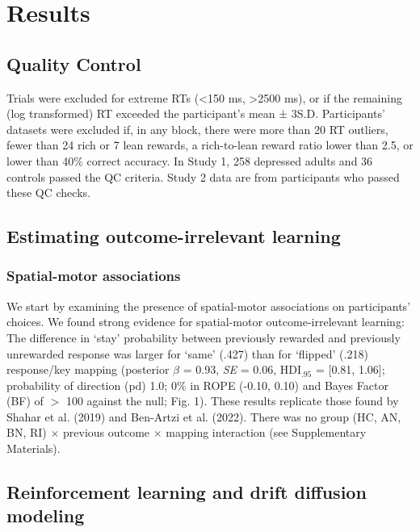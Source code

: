 \documentclass[
  man,floatsintext]{apa6}
\begin{document}
\hypertarget{results}{%
\section{Results}\label{results}}

\hypertarget{quality-control}{%
\subsection{Quality Control}\label{quality-control}}

Trials were excluded for extreme RTs (\textless150 ms, \textgreater2500 ms), or if
the remaining (log transformed) RT exceeded the participant's
mean ± 3S.D. Participants' datasets were excluded if, in any
block, there were more than 20 RT outliers, fewer than 24 rich
or 7 lean rewards, a rich-to-lean reward ratio lower than 2.5, or
lower than 40\% correct accuracy. In Study 1, 258 depressed adults
and 36 controls passed the QC criteria. Study 2 data are from participants who passed these QC checks.

\hypertarget{estimating-outcome-irrelevant-learning}{%
\subsection{Estimating outcome-irrelevant learning}\label{estimating-outcome-irrelevant-learning}}

\hypertarget{spatial-motor-associations}{%
\subsubsection{Spatial-motor associations}\label{spatial-motor-associations}}

We start by examining the presence of spatial-motor associations on participants' choices. We found strong evidence for spatial-motor outcome-irrelevant learning: The difference in `stay' probability between previously rewarded and previously unrewarded response was larger for `same' (.427) than for `flipped' (.218) response/key mapping (posterior \(\beta\) = 0.93, \emph{SE} = 0.06, \(\text{HDI}_{.95}\) = {[}0.81, 1.06{]}; probability of direction (pd) 1.0; 0\% in ROPE (-0.10, 0.10) and Bayes Factor (BF) of \(>\) 100 against the null; Fig. 1). These results replicate those found by Shahar et al. (2019) and Ben-Artzi et al. (2022). There was no group (HC, AN, BN, RI) \(\times\) previous outcome \(\times\) mapping interaction (see Supplementary Materials).

\hypertarget{reinforcement-learning-and-drift-diffusion-modeling}{%
\subsection{Reinforcement learning and drift diffusion modeling}\label{reinforcement-learning-and-drift-diffusion-modeling}}
\end{document}

